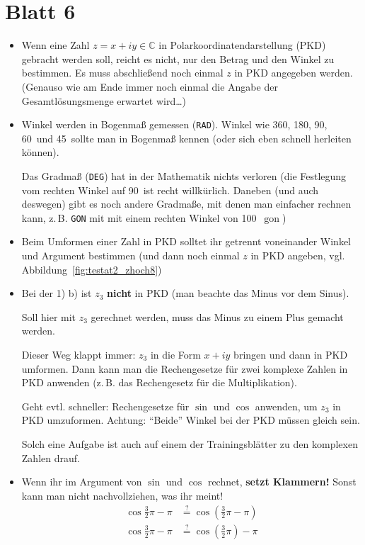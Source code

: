 \documentclass[11pt, a4paper]{article}
\newcommand{\C}{\mathbb{C}}
\begin{document}
\section*{Blatt 6}
\begin{itemize}
\item Wenn eine Zahl $z = x + iy \in \C$ in Polarkoordinatendarstellung (PKD) gebracht werden soll, reicht es nicht, nur den Betrag und den Winkel zu bestimmen. Es muss abschließend noch einmal $z$ in PKD angegeben werden. (Genauso wie am Ende immer noch einmal die Angabe der Gesamtlösungsmenge erwartet wird\dots)

\item Winkel werden in Bogenmaß gemessen (\texttt{RAD}). Winkel wie 360\textdegree, 180\textdegree, 90\textdegree, 60\textdegree~und 45\textdegree~sollte man in Bogenmaß kennen (oder sich eben schnell herleiten können).

Das Gradmaß (\texttt{DEG}) hat in der Mathematik nichts verloren (die Festlegung vom rechten Winkel auf 90\textdegree~ist recht willkürlich. Daneben (und auch deswegen) gibt es noch andere Gradmaße, mit denen man einfacher rechnen kann, z.\,B. \texttt{GON} mit mit einem rechten Winkel von 100~$\operatorname{gon}$)

\item Beim Umformen einer Zahl in PKD solltet ihr getrennt voneinander Winkel und Argument bestimmen (und dann noch einmal $z$ in PKD angeben, vgl.\,Abbildung~\ref{fig:testat2_zhoch8})


\item Bei der 1) b) ist $z_3$ \textbf{nicht} in PKD (man beachte das Minus vor dem Sinus). 

Soll hier mit $z_3$ gerechnet werden, muss das Minus zu einem Plus gemacht werden. 

Dieser Weg klappt immer: $z_3$ in die Form $x + iy$ bringen und dann in PKD umformen. Dann kann man die Rechengesetze für zwei komplexe Zahlen in PKD anwenden (z.\,B. das Rechengesetz für die Multiplikation). 

Geht evtl. schneller: Rechengesetze für $\sin$ und $\cos$ anwenden, um $z_3$ in PKD umzuformen. Achtung: \enquote{Beide} Winkel bei der PKD müssen gleich sein.

Solch eine Aufgabe ist auch auf einem der Trainingsblätter zu den komplexen Zahlen drauf. 

\item Wenn ihr im Argument von $\sin$ und $\cos$ rechnet, \textbf{setzt Klammern!} Sonst kann man nicht nachvollziehen, was ihr meint!
\begin{align*}
\cos \frac{3}{2}\pi - \pi 			&\stackrel{?}{=} 		\cos \left( \frac{3}{2}\pi - \pi  \right) \\
\cos \frac{3}{2}\pi - \pi 			&\stackrel{?}{=}			\cos \left( \frac{3}{2}\pi \right) - \pi 
\end{align*}


\end{itemize}
\end{document}
